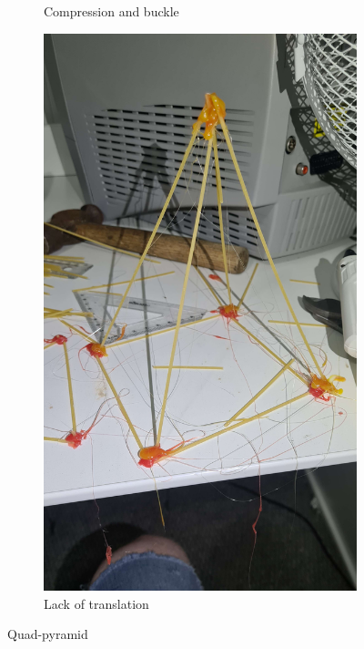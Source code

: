 \documentclass{report}
\newcommand{\subimgw}{.7\linewidth}
\begin{document}
\begin{figure}[H]
\begin{subfigure}{.5\textwidth}
		\caption{Compression and buckle}
		\label{fig:pyramid:a}
	\end{subfigure}%
	\begin{subfigure}{.5\textwidth}
		\centering
		\includegraphics[width=\subimgw]{pyramid-untranslated}

		\caption{Lack of translation}
		\label{fig:pyramid:untranslated}
	\end{subfigure}

	\caption{Quad-pyramid}
	\label{fig:pyramid}
\end{figure}
\end{document}
